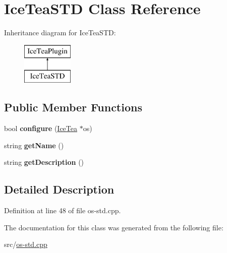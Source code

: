 \hypertarget{class_ice_tea_s_t_d}{}\section{Ice\+Tea\+S\+TD Class Reference}
\label{class_ice_tea_s_t_d}
Inheritance diagram for Ice\+Tea\+S\+TD\+:\begin{figure}[H]
\begin{center}
\leavevmode
\includegraphics[height=2.000000cm]{class_ice_tea_s_t_d}
\end{center}
\end{figure}
\subsection*{Public Member Functions}
\begin{DoxyCompactItemize}
\item 
bool {\bfseries configure} (\hyperlink{class_ice_tea}{Ice\+Tea} $\ast$os)\hypertarget{class_ice_tea_s_t_d_a625fa7d061eb201277a9abd55a00e9f7}{}\label{class_ice_tea_s_t_d_a625fa7d061eb201277a9abd55a00e9f7}

\item 
string {\bfseries get\+Name} ()\hypertarget{class_ice_tea_s_t_d_a9e8ed7ccfa18c35cd1995a5e2a976b3e}{}\label{class_ice_tea_s_t_d_a9e8ed7ccfa18c35cd1995a5e2a976b3e}

\item 
string {\bfseries get\+Description} ()\hypertarget{class_ice_tea_s_t_d_a088861170df3eab31b732d2863c919ac}{}\label{class_ice_tea_s_t_d_a088861170df3eab31b732d2863c919ac}

\end{DoxyCompactItemize}


\subsection{Detailed Description}


Definition at line 48 of file os-\/std.\+cpp.



The documentation for this class was generated from the following file\+:\begin{DoxyCompactItemize}
\item 
src/\hyperlink{os-std_8cpp}{os-\/std.\+cpp}\end{DoxyCompactItemize}
